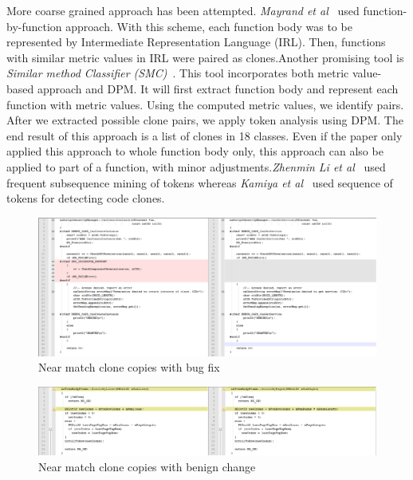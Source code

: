 \documentclass[nocopyrightspace]{sigplanconf}
\begin{document}
More coarse grained approach has been attempted. \emph{Mayrand et al}~\cite{Mayrand1996} used function-by-function approach. With this scheme, each function body was to be represented by Intermediate Representation Language (IRL). Then, functions with similar metric values in IRL were paired as clones.Another promising tool is \emph{Similar method Classifier (SMC)}~\cite{Balazinska1999}. This tool incorporates both metric value-based approach and DPM. It will first extract function body and represent each function with metric values. Using the computed metric values, we identify pairs. After we extracted possible clone pairs, we apply token analysis using DPM. The end result of this approach is a list of clones in 18 classes. Even if the paper only applied this approach to whole function body only, this approach can also be applied to part of a function, with minor adjustments.\emph{Zhenmin Li et al}~\citep{Li2006} used frequent subsequence mining of tokens whereas \emph{Kamiya et al}~\cite{Kamiya2002} used sequence of tokens for detecting code clones. 

\begin{figure}[t!]
\centering
\includegraphics[width=\textwidth]{BugCase.png}
\caption{Near match clone copies with bug fix}
\label{fig:buggy}
\end{figure}

\begin{figure}[t!]
\centering
\includegraphics[width=\textwidth]{Benigncase.png}
\caption{Near match clone copies with benign change}
\label{fig:benign}
\end{figure}
\end{document}
